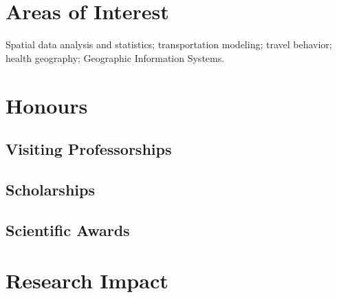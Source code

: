 \documentclass[11pt,a4paper,]{awesome-cv}
\begin{document}
\hypertarget{areas-of-interest}{%
\section{Areas of Interest}\label{areas-of-interest}}

Spatial data analysis and statistics; transportation modeling; travel
behavior; health geography; Geographic Information Systems.

\hypertarget{honours}{%
\section{Honours}\label{honours}}

\hypertarget{visiting-professorships}{%
\subsection{Visiting Professorships}\label{visiting-professorships}}

\begin{cventries}
\end{cventries}

\hypertarget{scholarships}{%
\subsection{Scholarships}\label{scholarships}}

\begin{cventries}
    \vspace{-4.0mm}
    \vspace{-4.0mm}
\end{cventries}

\hypertarget{scientific-awards}{%
\subsection{Scientific Awards}\label{scientific-awards}}

\begin{cventries}
\end{cventries}

\hypertarget{research-impact}{%
\section{Research Impact}\label{research-impact}}
\end{document}
